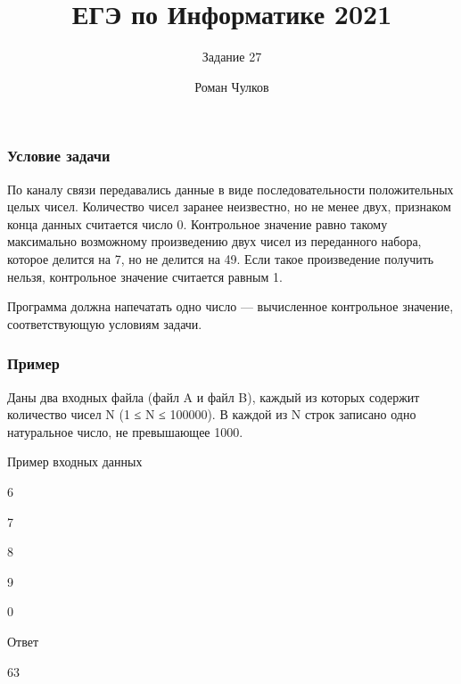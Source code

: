 \documentclass{beamer}
\title[Задание 27]{ЕГЭ по Информатике 2021}
\subtitle{Задание 27}
\author{Роман Чулков}
\institute{СПбГУТ}
\begin{document}
\frame{\titlepage}

\begin{frame}

    \frametitle{Условие задачи}

    По каналу связи передавались данные в виде последовательности положительных целых чисел. Количество чисел заранее неизвестно, но не менее двух, признаком конца данных считается число 0. Контрольное значение равно такому максимально возможному произведению двух чисел из переданного набора, которое делится на 7, но не делится на 49. Если такое произведение получить нельзя, контрольное значение считается равным 1.

    Программа должна напечатать одно число — вычисленное контрольное значение, соответствующую условиям задачи.

\end{frame}

\begin{frame}

    \frametitle{Пример}

    Даны два входных файла (файл A и файл B), каждый из которых содержит количество чисел N (1 ≤ N ≤ 100000). В каждой из N строк записано одно натуральное число, не превышающее 1000.

    \pause

    \begin{block}{Пример входных данных}

        6

        7

        8

        9

        0
        
    \end{block}

    \pause

    \begin{alertblock}{Ответ}

        63

    \end{alertblock}

\end{frame}
\end{document}
